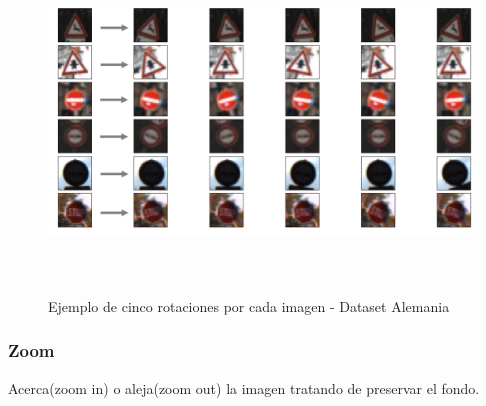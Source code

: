 	        \begin{figure}[H]
				\begin{center}
				\includegraphics[width=1\textwidth,height=9cm]{images/desarrollo/Augment/fixedrotation}
				\end{center}
				\begin{center}
				\caption{\small{Ejemplo de cinco rotaciones por cada imagen - Dataset Alemania}}
				{\small{\fontsize{10}{16.8}\selectfont {Fuente: Elaboración propia}}}
				\end{center}
				\vspace{-1.5em}
			\end{figure}
	    

	    \subsubsection{Zoom}
	    	\vspace{-1.5em}
	    	Acerca(zoom in) o aleja(zoom out) la imagen  tratando de preservar el fondo.


